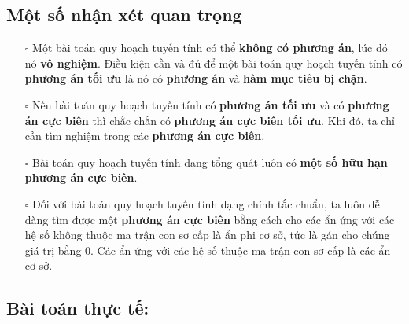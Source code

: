 \documentclass{article}
\begin{document}
\subsection{Một số nhận xét quan trọng}
\begin{itemize}
    \item [$\square$] Một bài toán quy hoạch tuyến tính có thể \textbf{không có phương án}, lúc đó nó \textbf{vô nghiệm}. Điều kiện cần và đủ để một bài toán quy hoạch tuyến tính có \textbf{phương án tối ưu} là nó có \textbf{phương án} và \textbf{hàm mục tiêu bị chặn}.
    \item [$\square$] Nếu bài toán quy hoạch tuyến tính có \textbf{phương án tối ưu} và có \textbf{phương án cực biên} thì chắc chắn có \textbf{phương án cực biên tối ưu}. Khi đó, ta chỉ cần tìm nghiệm trong các \textbf{phương án cực biên}.
    \item [$\square$] Bài toán quy hoạch tuyến tính dạng tổng quát luôn có \textbf{một số hữu hạn phương án cực biên}.
    \item [$\square$] Đối với bài toán quy hoạch tuyến tính dạng chính tắc chuẩn, ta luôn dễ dàng tìm được một \textbf{phương án cực biên} bằng cách cho các ẩn ứng với các hệ số không thuộc ma trận con sơ cấp là ẩn phi cơ sở, tức là gán cho chúng giá trị bằng 0. Các ẩn ứng với các hệ số thuộc ma trận con sơ cấp là các ẩn cơ sở.
\end{itemize}
\newpage
\subsection{Bài toán thực tế:}
\end{document}
